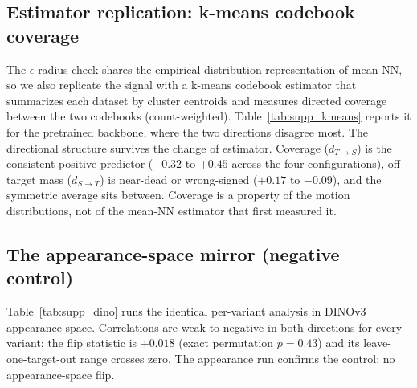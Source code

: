 \documentclass[runningheads]{llncs}
\newcommand{\dtb}{d_{S\to T}}
\newcommand{\dbt}{d_{T\to S}}
\newcommand{\bst}[1]{\textcolor{green!60!black}{#1}}
\begin{document}
\begin{table}[h]
\centering
\caption{$\epsilon$-radius coverage replication of the rule (per variant,
regime-grouped).}
\label{tab:supp_eps}
\scriptsize
\setlength{\tabcolsep}{3pt}

\end{table}

\subsection{Estimator replication: k-means codebook coverage}
The $\epsilon$-radius check shares the empirical-distribution representation of mean-NN, so
we also replicate the signal with a k-means codebook estimator that summarizes
each dataset by cluster centroids and measures directed coverage between the two
codebooks (count-weighted). Table~\ref{tab:supp_kmeans} reports it for the
pretrained backbone, where the two directions disagree most. The directional
structure survives the change of estimator. Coverage ($\dbt$) is the consistent
positive predictor ($+0.32$ to $+0.45$ across the four configurations), off-target
mass ($\dtb$) is near-dead or wrong-signed ($+0.17$ to $-0.09$), and the symmetric
average sits between. Coverage is a property of the motion distributions, not of the
mean-NN estimator that first measured it.

\begin{table}[h]
\centering
\caption{\textbf{k-means codebook coverage replicates the directional signal.}
Within-context Spearman $\rho$ between peak transfer and each count-weighted
k-means codebook distance, pretrained backbone. \bst{Green} $=$ coverage (our
claim). Coverage predicts, off-target is near-dead, the symmetric average hedges,
matching mean-NN (Table~\ref{tab:law}) and the $\epsilon$-radius estimator
(Table~\ref{tab:supp_eps}).}
\label{tab:supp_kmeans}
\small
\setlength{\tabcolsep}{6pt}

\end{table}

\subsection{The appearance-space mirror (negative control)}
Table~\ref{tab:supp_dino} runs the identical per-variant analysis in DINOv3
appearance space. Correlations are weak-to-negative in both directions for
every variant; the flip statistic is $+0.018$ (exact permutation $p{=}0.43$)
and its leave-one-target-out range crosses zero. The appearance run confirms
the control: no appearance-space flip.
\end{document}
